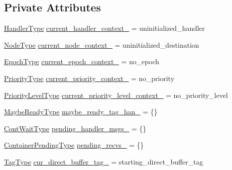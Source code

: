 \subsection*{Private Attributes}
\begin{DoxyCompactItemize}
\item 
\hyperlink{namespacevt_af64846b57dfcaf104da3ef6967917573}{Handler\+Type} \hyperlink{structvt_1_1messaging_1_1_active_messenger_a6e03effc6a6e98384d4488826be55e14}{current\+\_\+handler\+\_\+context\+\_\+} = uninitialized\+\_\+handler
\item 
\hyperlink{namespacevt_a866da9d0efc19c0a1ce79e9e492f47e2}{Node\+Type} \hyperlink{structvt_1_1messaging_1_1_active_messenger_a416bc461f669e4715b30e3f30064aa42}{current\+\_\+node\+\_\+context\+\_\+} = uninitialized\+\_\+destination
\item 
\hyperlink{namespacevt_a985a5adf291c34a3ca263b3378388236}{Epoch\+Type} \hyperlink{structvt_1_1messaging_1_1_active_messenger_aed6bd1780915417e6f4c186a6573edac}{current\+\_\+epoch\+\_\+context\+\_\+} = no\+\_\+epoch
\item 
\hyperlink{namespacevt_a86bff9f556eb761b27fc8600d006ac04}{Priority\+Type} \hyperlink{structvt_1_1messaging_1_1_active_messenger_a86110eccb05721da80482354f930d40a}{current\+\_\+priority\+\_\+context\+\_\+} = no\+\_\+priority
\item 
\hyperlink{namespacevt_a53e07fdb3351b0f263e0dfd51b968d5e}{Priority\+Level\+Type} \hyperlink{structvt_1_1messaging_1_1_active_messenger_a6be14073d0706e2e410a7ed87aa84acd}{current\+\_\+priority\+\_\+level\+\_\+context\+\_\+} = no\+\_\+priority\+\_\+level
\item 
\hyperlink{structvt_1_1messaging_1_1_active_messenger_a745d5e8cad8c2f67d20479afacc6e134}{Maybe\+Ready\+Type} \hyperlink{structvt_1_1messaging_1_1_active_messenger_a2db0ef8babe408d23a62518bd0ff180b}{maybe\+\_\+ready\+\_\+tag\+\_\+han\+\_\+} = \{\}
\item 
\hyperlink{structvt_1_1messaging_1_1_active_messenger_a1c52f4ec0c93821191cb3e69dc7c8604}{Cont\+Wait\+Type} \hyperlink{structvt_1_1messaging_1_1_active_messenger_aae19c8a01b0c483f20d58bd9114cac0e}{pending\+\_\+handler\+\_\+msgs\+\_\+} = \{\}
\item 
\hyperlink{structvt_1_1messaging_1_1_active_messenger_a388e97eeb72592e57551e045b43bcfde}{Container\+Pending\+Type} \hyperlink{structvt_1_1messaging_1_1_active_messenger_a77b9f9e025e09d85ba39262e523599b8}{pending\+\_\+recvs\+\_\+} = \{\}
\item 
\hyperlink{namespacevt_a84ab281dae04a52a4b243d6bf62d0e52}{Tag\+Type} \hyperlink{structvt_1_1messaging_1_1_active_messenger_a9a85ff32f58ff99db2c89da92e9c8443}{cur\+\_\+direct\+\_\+buffer\+\_\+tag\+\_\+} = starting\+\_\+direct\+\_\+buffer\+\_\+tag

\end{DoxyCompactItemize}
